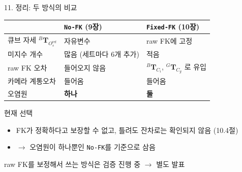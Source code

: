 \documentclass[aspectratio=169,11pt]{beamer}
\newif\ifcorrectedfk
\newcommand{\T}[3][]{{}^{#2}\mathbf{T}^{#1}_{#3}}   %
\newcommand{\Oref}{O^{\mathrm{ref}}}   %
\begin{document}
\ifcorrectedfk\else
\begin{frame}{11. 정리: 두 방식의 비교}
  \begin{center}
    \small
    \begin{tabular}{lll}
      \toprule
       & \texttt{No-FK} (9장) & \texttt{Fixed-FK} (10장) \\
      \midrule
      큐브 자세 $\T{B}{\Oref_s}$ & 자유변수 & raw FK에 고정 \\
      미지수 개수 & 많음 (세트마다 $6$개 추가) & 적음 \\
      raw FK 오차 & 들어오지 않음 & $\T{B}{C_i}$, $\T{G}{C_g}$ 로 유입 \\
      카메라 계통오차 & 들어옴 & 들어옴 \\
      오염원 & \textbf{하나} & \textbf{둘} \\
      \bottomrule
    \end{tabular}
  \end{center}
  \vfill
  \begin{alertblock}{현재 선택}
    \begin{itemize}
      \item FK가 정확하다고 보장할 수 없고,
        틀려도 잔차로는 확인되지 않음 (10.4절)
      \item $\rightarrow$ 오염원이 하나뿐인 \texttt{No-FK}를 기준으로 삼음
    \end{itemize}
  \end{alertblock}
  \vfill
  \centering
  {\small raw FK를 보정해서 쓰는 방식은 검증 진행 중 $\rightarrow$ 별도 발표}
\end{frame}
\fi
\end{document}
